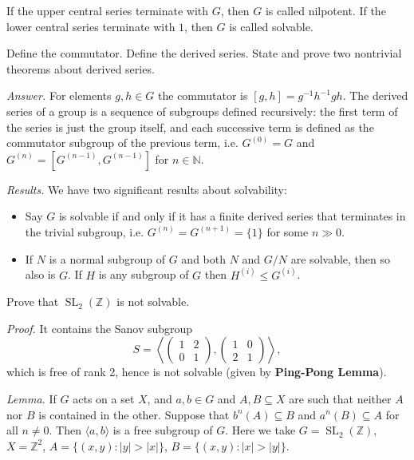\documentclass{mathproblems}
\newcommand\Z{\mathbb{Z}}
\begin{document}
\begin{questions}
If the upper central series terminate with $G$, then $G$ is called nilpotent. If the lower central series terminate with $1$, then $G$ is called solvable.


\miquestion
{\color{blue} Define the commutator. Define the derived series. State and prove two nontrivial theorems about derived series.}

\textit{Answer.} For elements $g,h\in G$ the commutator is $[g,h]=g^{-1}h^{-1}gh$. The derived series of a group is a sequence of subgroups defined recursively: the first term of the series is just the group itself, and each successive term is defined as the commutator subgroup of the previous term, i.e. $G^{(0)}=G$ and $G^{(n)}=[G^{(n-1)},G^{(n-1)}]$ for $n\in\mathbb{N}$. 

\textit{Results.} We have two significant results about solvability: \vspace{-4pt}
\begin{itemize}
\item Say $G$ is solvable if and only if it has a finite derived series that terminates in the trivial subgroup, i.e. $G^{(n)}=G^{(n+1)}=\{1\}$ for some $n\gg 0$.
\item If $N$ is a normal subgroup of $G$ and both $N$ and $G/N$ are solvable, then so also is $G$. If $H$ is any subgroup of $G$ then $H^{(i)}\leqslant G^{(i)}$.
\end{itemize}



\miquestion
{\color{blue} Prove that $\operatorname{SL}_2(\Z)$ is not solvable.}

\textit{Proof.} It contains the Sanov subgroup
$$
S=\left\langle \begin{pmatrix}1&2\\0&1\end{pmatrix},\begin{pmatrix}1&0\\2&1\end{pmatrix}\right\rangle,
$$
which is free of rank 2, hence is not solvable (given by {\color{violet}\textbf{Ping-Pong Lemma}}).

{\color{violet}
\textit{Lemma.} If $G$ acts on a set $X$, and $a, b \in G$ and $A, B \subseteq X$ are such that neither $A$ nor $B$ is contained in the other. Suppose that $b^{n}(A) \subseteq B$ and $a^{n}(B) \subseteq A$ for all $n\neq 0$. Then $\langle a,b \rangle$ is a free subgroup of $G$. Here we take $G=\operatorname{SL}_2(\Z)$, $X=\Z^2$, $A=\{(x,y):|y|>|x|\}$, $B=\{(x,y):|x|>|y|\}$.
}


\end{questions}
\end{document}

